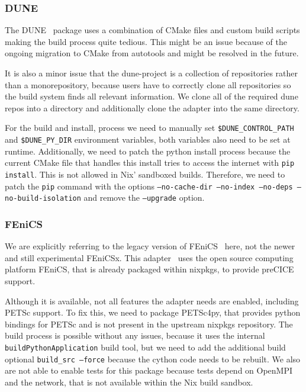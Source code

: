 \documentclass{eceasst}
\begin{document}
\subsubsection{DUNE}

The DUNE~\cite{bastian2020dune} package uses a combination of CMake files and custom build scripts making the build process quite tedious.
This might be an issue because of the ongoing migration to CMake from autotools and might be resolved in the future.

It is also a minor issue that the dune-project is a collection of repositories rather than a monorepository, because users have to correctly clone all repositories so the build system finds all relevant information.
We clone all of the required dune repos into a directory and additionally clone the adapter into the same directory.

For the build and install, process we need to manually set \texttt{\$DUNE\_CONTROL\_PATH} and \texttt{\$DUNE\_PY\_DIR} environment variables, both variables also need to be set at runtime.
Additionally, we need to patch the python install process because the current CMake file that handles this install tries to access the internet with \texttt{pip install}.
This is not allowed in Nix' sandboxed builds.
Therefore, we need to patch the \texttt{pip} command with the options \texttt{--no-cache-dir --no-index --no-deps --no-build-isolation} and remove the \texttt{--upgrade} option.\\

\subsubsection{FEniCS}

We are explicitly referring to the legacy version of FEniCS~\cite{fenics} here, not the newer and still experimental FEniCSx.
This adapter~\cite{Rodenberg2021} uses the open source computing platform FEniCS, that is already packaged within nixpkgs, to provide preCICE support.

Although it is available, not all features the adapter needs are enabled, including PETSc support.
To fix this, we need to package PETSc4py, that provides python bindings for PETSc and is not present in the upstream nixpkgs repository.
The build process is possible without any issues, because it uses the internal \texttt{buildPythonApplication} build tool, but we need to add the additional build optional \texttt{build\_src --force} because the cython code needs to be rebuilt.
We also are not able to enable tests for this package because tests depend on OpenMPI and the network, that is not available within the Nix build sandbox.
\end{document}
